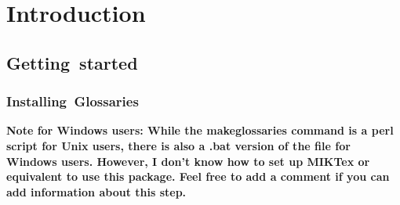 
\chapter{Introduction}
\label{chap:0}
%
%
\section{Getting~started}
%
	\subsection{Installing~Glossaries}
		\bf{Note for Windows users:} While the makeglossaries command is a perl script for Unix users, there is also a .bat version of the file for Windows users. However, I don’t know how to set up MIKTex or equivalent to use this package. Feel free to add a comment if you can add information about this step.

